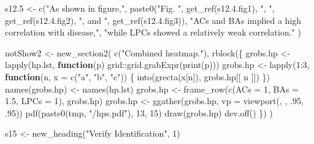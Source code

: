 \documentclass[
]{article}
\newenvironment{Shaded}{\begin{snugshade}}{\end{snugshade}}
\newcommand{\AttributeTok}[1]{\textcolor[rgb]{0.77,0.63,0.00}{#1}}
\newcommand{\ControlFlowTok}[1]{\textcolor[rgb]{0.13,0.29,0.53}{\textbf{#1}}}
\newcommand{\DecValTok}[1]{\textcolor[rgb]{0.00,0.00,0.81}{#1}}
\newcommand{\FloatTok}[1]{\textcolor[rgb]{0.00,0.00,0.81}{#1}}
\newcommand{\FunctionTok}[1]{\textcolor[rgb]{0.00,0.00,0.00}{#1}}
\newcommand{\NormalTok}[1]{#1}
\newcommand{\OtherTok}[1]{\textcolor[rgb]{0.56,0.35,0.01}{#1}}
\newcommand{\SpecialCharTok}[1]{\textcolor[rgb]{0.00,0.00,0.00}{#1}}
\newcommand{\StringTok}[1]{\textcolor[rgb]{0.31,0.60,0.02}{#1}}
\begin{document}
\begin{Shaded}
\begin{Highlighting}[]
\NormalTok{s12}\FloatTok{.5} \OtherTok{\textless{}{-}} \FunctionTok{c}\NormalTok{(}\StringTok{"As shown in figure,"}\NormalTok{,}
  \FunctionTok{paste0}\NormalTok{(}\StringTok{"Fig. "}\NormalTok{, }\FunctionTok{get\_ref}\NormalTok{(s12.}\FloatTok{4.}\NormalTok{fig1), }\StringTok{", "}\NormalTok{, }\FunctionTok{get\_ref}\NormalTok{(s12.}\FloatTok{4.}\NormalTok{fig2), }\StringTok{", and "}\NormalTok{,}
    \FunctionTok{get\_ref}\NormalTok{(s12.}\FloatTok{4.}\NormalTok{fig3)),}
  \StringTok{"ACs and BAs implied a high correlation with disease,"}\NormalTok{,}
  \StringTok{"while LPCs showed a relatively weak correlation."}
\NormalTok{)}

\NormalTok{notShow2 }\OtherTok{\textless{}{-}} \FunctionTok{new\_section2}\NormalTok{(}
  \FunctionTok{c}\NormalTok{(}\StringTok{"Combined heatmap."}\NormalTok{),}
  \FunctionTok{rblock}\NormalTok{(\{}
\NormalTok{    grobs.hp }\OtherTok{\textless{}{-}} \FunctionTok{lapply}\NormalTok{(hp.lst, }\ControlFlowTok{function}\NormalTok{(p) grid}\SpecialCharTok{::}\FunctionTok{grid.grabExpr}\NormalTok{(}\FunctionTok{print}\NormalTok{(p)))}
\NormalTok{    grobs.hp }\OtherTok{\textless{}{-}} \FunctionTok{lapply}\NormalTok{(}\DecValTok{1}\SpecialCharTok{:}\DecValTok{3}\NormalTok{,}
      \ControlFlowTok{function}\NormalTok{(n, }\AttributeTok{x =} \FunctionTok{c}\NormalTok{(}\StringTok{"a"}\NormalTok{, }\StringTok{"b"}\NormalTok{, }\StringTok{"c"}\NormalTok{)) \{}
        \FunctionTok{into}\NormalTok{(}\FunctionTok{grecta}\NormalTok{(x[n]), grobs.hp[[ n ]])}
\NormalTok{      \})}
    \FunctionTok{names}\NormalTok{(grobs.hp) }\OtherTok{\textless{}{-}} \FunctionTok{names}\NormalTok{(hp.lst)}
\NormalTok{    grobs.hp }\OtherTok{\textless{}{-}} \FunctionTok{frame\_row}\NormalTok{(}\FunctionTok{c}\NormalTok{(}\AttributeTok{ACs =} \DecValTok{1}\NormalTok{, }\AttributeTok{BAs =} \FloatTok{1.5}\NormalTok{, }\AttributeTok{LPCs =} \DecValTok{1}\NormalTok{), grobs.hp)}
\NormalTok{    grobs.hp }\OtherTok{\textless{}{-}} \FunctionTok{ggather}\NormalTok{(grobs.hp, }\AttributeTok{vp =} \FunctionTok{viewport}\NormalTok{(, , .}\DecValTok{95}\NormalTok{, .}\DecValTok{95}\NormalTok{))}
    \FunctionTok{pdf}\NormalTok{(}\FunctionTok{paste0}\NormalTok{(tmp, }\StringTok{"/hps.pdf"}\NormalTok{), }\DecValTok{13}\NormalTok{, }\DecValTok{15}\NormalTok{)}
    \FunctionTok{draw}\NormalTok{(grobs.hp)}
    \FunctionTok{dev.off}\NormalTok{()}
\NormalTok{  \})}
\NormalTok{)}

\NormalTok{s15 }\OtherTok{\textless{}{-}} \FunctionTok{new\_heading}\NormalTok{(}\StringTok{"Verify Identification"}\NormalTok{, }\DecValTok{1}\NormalTok{)}


\end{Highlighting}
\end{Shaded}
\end{document}
